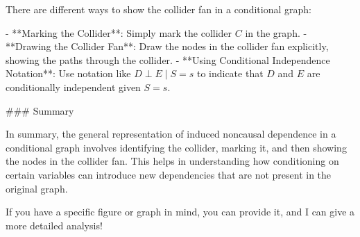 There are different ways to show the collider fan in a conditional graph:

- **Marking the Collider**: Simply mark the collider \( C \) in the graph.
- **Drawing the Collider Fan**: Draw the nodes in the collider fan explicitly, showing the paths through the collider.
- **Using Conditional Independence Notation**: Use notation like \( D \perp E \mid S = s \) to indicate that \( D \) and \( E \) are conditionally independent given \( S = s \).

### Summary

In summary, the general representation of induced noncausal dependence in a conditional graph involves identifying the collider, marking it, and then showing the nodes in the collider fan. This helps in understanding how conditioning on certain variables can introduce new dependencies that are not present in the original graph.

If you have a specific figure or graph in mind, you can provide it, and I can give a more detailed analysis!